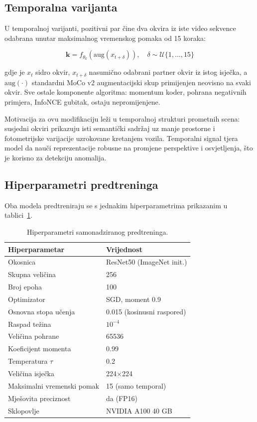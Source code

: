 \documentclass[diplomskirad]{fer}
\begin{document}
\subsection{Temporalna varijanta}
\label{sec:temporal-moco}

U temporalnoj varijanti, pozitivni par čine dva okvira iz iste video 
sekvence odabrana unutar maksimalnog vremenskog pomaka od 15 koraka:

\begin{equation}
	\mathbf{k} = f_{\theta_k}(\text{aug}(x_{t+\delta})), 
	\quad \delta \sim \mathcal{U}\{1, \ldots, 15\}
\end{equation}

gdje je $x_t$ sidro okvir, $x_{t+\delta}$ nasumično odabrani partner 
okvir iz istog isječka, a $\text{aug}(\cdot)$ standardni MoCo v2 
augmentacijski skup primijenjen neovisno na svaki okvir. Sve ostale 
komponente algoritma: momentum koder, pohrana negativnih primjera, 
InfoNCE gubitak, ostaju nepromijenjene.

Motivacija za ovu modifikaciju leži u temporalnoj strukturi prometnih 
scena: susjedni okviri prikazuju isti semantički sadržaj uz manje 
prostorne i fotometrijske varijacije uzrokovane kretanjem vozila. 
Temporalni signal tjera model da nauči reprezentacije robusne na 
promjene perspektive i osvjetljenja, što je korisno za detekciju 
anomalija.

\subsection{Hiperparametri predtreninga}

Oba modela predtreniraju se s jednakim hiperparametrima prikazanim 
u tablici~\ref{tab:ssl_hyperparams}.

\begin{table}[H]
	\centering
	\caption{Hiperparametri samonadziranog predtreninga.}
	\label{tab:ssl_hyperparams}
	\begin{tabular}{|l|l|}
		\hline
		\textbf{Hiperparametar} & \textbf{Vrijednost} \\
		\hline
		Okosnica            & ResNet50 (ImageNet init.) \\
		Skupna veličina     & 256 \\
		Broj epoha          & 100 \\
		Optimizator         & SGD, moment 0.9 \\
		Osnovna stopa učenja & 0.015 (kosinusni raspored) \\
		Raspad težina       & $10^{-4}$ \\
		Veličina pohrane    & 65536 \\
		Koeficijent momenta & 0.99 \\
		Temperatura $\tau$  & 0.2 \\
		Veličina isječka    & 224$\times$224 \\
		Maksimalni vremenski pomak & 15 (samo temporal) \\
		Mješovita preciznost & da (FP16) \\
		Sklopovlje          & NVIDIA A100 40 GB \\
		\hline
	\end{tabular}
\end{table}
\end{document}

